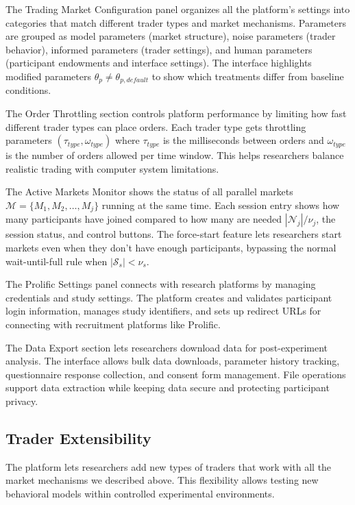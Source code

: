 The Trading Market Configuration panel organizes all the platform's settings into categories that match different trader types and market mechanisms. Parameters are grouped as model parameters (market structure), noise parameters (trader behavior), informed parameters (trader settings), and human parameters (participant endowments and interface settings). The interface highlights modified parameters $\theta_p \neq \theta_{p,default}$ to show which treatments differ from baseline conditions.

The Order Throttling section controls platform performance by limiting how fast different trader types can place orders. Each trader type gets throttling parameters $(\tau_{type}, \omega_{type})$ where $\tau_{type}$ is the milliseconds between orders and $\omega_{type}$ is the number of orders allowed per time window. This helps researchers balance realistic trading with computer system limitations.

The Active Markets Monitor shows the status of all parallel markets $\mathcal{M} = \{M_1, M_2, \ldots, M_j\}$ running at the same time. Each session entry shows how many participants have joined compared to how many are needed $|\mathcal{N}_j|/\nu_j$, the session status, and control buttons. The force-start feature lets researchers start markets even when they don't have enough participants, bypassing the normal wait-until-full rule when $|\mathcal{S}_s| < \nu_s$.

The Prolific Settings panel connects with research platforms by managing credentials and study settings. The platform creates and validates participant login information, manages study identifiers, and sets up redirect URLs for connecting with recruitment platforms like Prolific.

The Data Export section lets researchers download data for post-experiment analysis. The interface allows bulk data downloads, parameter history tracking, questionnaire response collection, and consent form management. File operations support data extraction while keeping data secure and protecting participant privacy.

\subsection{Trader Extensibility}
\label{sec:extensibility}

The platform lets researchers add new types of traders that work with all the market mechanisms we described above. This flexibility allows testing new behavioral models within controlled experimental environments.

